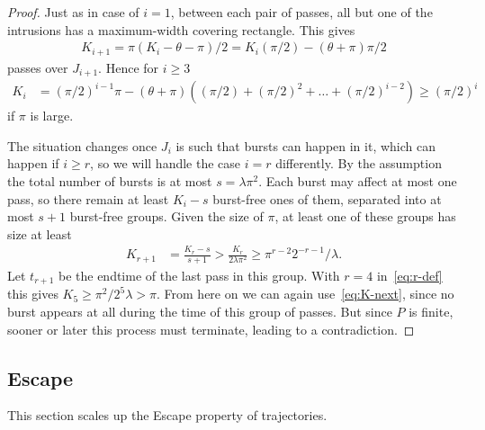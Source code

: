 \documentclass[11pt]{memoir}
\theoremstyle{definition} %
\renewcommand{\ge}{\geq}
\def\B{B}
\newcommand{\passno}{\pi}
\newcommand{\Q}{Q}
\renewcommand{\r}{r} %
\begin{document}
\begin{proof}
Just as in case of \( i=1 \), between each pair of passes, all but one of the intrusions has a maximum-width
covering rectangle.
This gives
\begin{align}\label{eq:K-next}
   K_{i+1}=\passno(K_{i}-\theta-\passno)/2 = K_{i}(\passno /2)-(\theta+\passno)\passno/2
\end{align}
passes over \( J_{i+1} \).
Hence for \( i\ge 3 \)
\begin{align*}
  K_{i} &= (\passno/2)^{i-1}\passno -(\theta+\passno)((\passno/2)+(\passno/2)^{2}+\dots+(\passno/2)^{i-2})
\ge (\passno/2)^{i}
\end{align*}
if \( \passno \) is large.

The situation changes once \( J_{i} \) is such that bursts can happen in it, which can happen if \( i\ge r \),
so we will handle the case \( i=\r \) differently.
By the assumption the total number of bursts is at most \( s=\lambda\passno^{2} \).
Each burst may affect at most one pass, so there remain at least \( K_{i}-s \) burst-free ones of them,
separated into at most \( s+1 \) burst-free groups.
Given the size of \( \passno \), at least one of these groups has size at least
\begin{align*}
  K_{\r+1}&=\frac{K_{\r}-s}{s+1} > \frac{K_{\r}}{2\lambda\passno^{2}} \ge \pi^{r-2}2^{-r-1}/\lambda.
\end{align*}
Let \( t_{r+1} \) be the endtime of the last pass in this group.
With \( \r = 4 \) in~\eqref{eq:r-def} this gives \( K_{5}\ge \passno^{2}/2^{5}\lambda > \passno \).
From here on we can again use~\eqref{eq:K-next}, since no burst appears at all during
the time of this group of passes.
But since \( P \) is finite, sooner or later this process must terminate, leading to a contradiction.
\end{proof}


\subsection{Escape}\label{sec:escape}

This section scales up the Escape property of trajectories.


\end{document}
